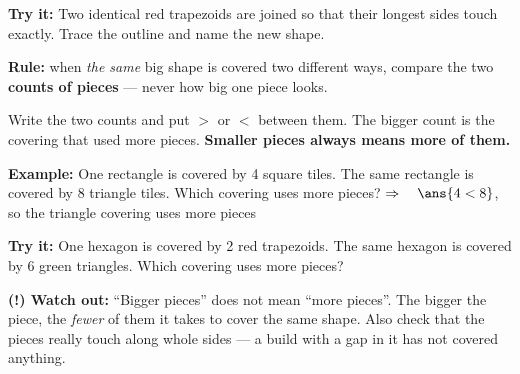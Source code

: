 \documentclass[12pt]{article}
\begin{document}
\begin{tryitbox}
\textbf{Try it:} \quad Two identical red trapezoids are joined so that their longest
sides touch exactly. Trace the outline and name the new shape.\\[2pt]
\end{tryitbox}


\begin{formulabox}
\textbf{Rule:} when \emph{the same} big shape is covered two different ways, compare the
two \textbf{counts of pieces} --- never how big one piece looks.\par
\smallskip
Write the two counts and put $>$ or $<$ between them. The bigger count is the covering
that used more pieces. \textbf{Smaller pieces always means more of them.}
\end{formulabox}

\begin{examplebox}
\textbf{Example:} \quad One rectangle is covered by 4 square tiles. The same rectangle is
covered by 8 triangle tiles. Which covering uses more pieces?
$\Rightarrow\quad \ans{4 < 8}$, so the triangle covering uses more pieces
\end{examplebox}

\begin{tryitbox}
\textbf{Try it:} \quad One hexagon is covered by 2 red trapezoids. The same hexagon is
covered by 6 green triangles. Which covering uses more pieces?\\[2pt]
\end{tryitbox}

\begin{watchoutbox}
\textbf{(!) Watch out:} ``Bigger pieces'' does not mean ``more pieces''. The bigger the
piece, the \emph{fewer} of them it takes to cover the same shape. Also check that the
pieces really touch along whole sides --- a build with a gap in it has not covered
anything.
\end{watchoutbox}
\end{document}
